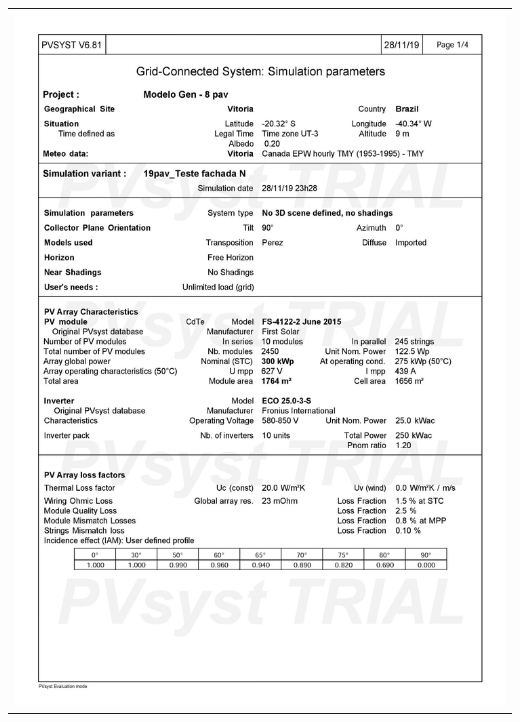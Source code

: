 \begin{table}[H]
    \centering
    \begin{tabular}{l}
        \includegraphics[width=\textwidth]{figures/attachments/resultpv25.jpg}
    \end{tabular}
\end{table}
\pagebreak
